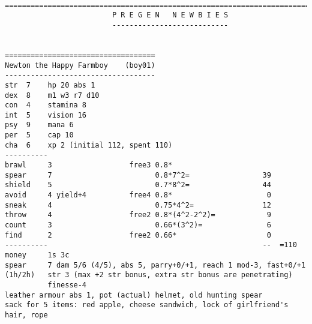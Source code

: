\

\pagebreak[1]
\tiny \begin{samepage} \begin{verbatim}
================================================================================
                         P R E G E N   N E W B I E S
                         ---------------------------


===================================
Newton the Happy Farmboy    (boy01)
-----------------------------------
str  7    hp 20 abs 1
dex  8    m1 w3 r7 d10
con  4    stamina 8
int  5    vision 16
psy  9    mana 6
per  5    cap 10
cha  6    xp 2 (initial 112, spent 110)
----------
brawl     3                  free3 0.8*
spear     7                        0.8*7^2=                 39
shield    5                        0.7*8^2=                 44
avoid     4 yield+4          free4 0.8*                      0
sneak     4                        0.75*4^2=                12
throw     4                  free2 0.8*(4^2-2^2)=            9
count     3                        0.66*(3^2)=               6
find      2                  free2 0.66*                     0
----------                                                  --  =110
money     1s 3c
spear     7 dam 5/6 (4/5), abs 5, parry+0/+1, reach 1 mod-3, fast+0/+1
(1h/2h)   str 3 (max +2 str bonus, extra str bonus are penetrating)
          finesse-4
leather armour abs 1, pot (actual) helmet, old hunting spear
sack for 5 items: red apple, cheese sandwich, lock of girlfriend's hair, rope
\end{verbatim} \end{samepage} \normalsize


\

